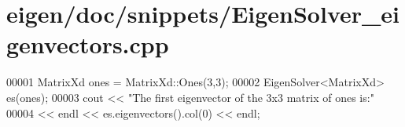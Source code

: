 \hypertarget{eigen_2doc_2snippets_2_eigen_solver__eigenvectors_8cpp_source}{}\section{eigen/doc/snippets/\+Eigen\+Solver\+\_\+eigenvectors.cpp}
\label{eigen_2doc_2snippets_2_eigen_solver__eigenvectors_8cpp_source}

\begin{DoxyCode}
00001 MatrixXd ones = MatrixXd::Ones(3,3);
00002 EigenSolver<MatrixXd> es(ones);
00003 cout << \textcolor{stringliteral}{"The first eigenvector of the 3x3 matrix of ones is:"}
00004      << endl << es.eigenvectors().col(0) << endl;
\end{DoxyCode}
